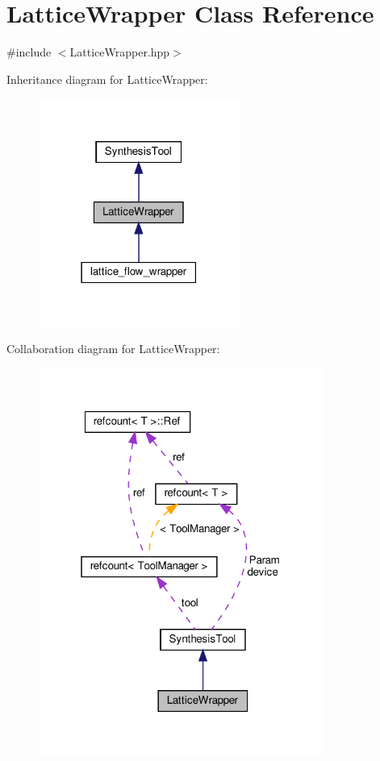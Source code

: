 \hypertarget{classLatticeWrapper}{}\section{Lattice\+Wrapper Class Reference}
\label{classLatticeWrapper}


{\ttfamily \#include $<$Lattice\+Wrapper.\+hpp$>$}



Inheritance diagram for Lattice\+Wrapper\+:
\nopagebreak
\begin{figure}[H]
\begin{center}
\leavevmode
\includegraphics[width=186pt]{d8/d0e/classLatticeWrapper__inherit__graph}
\end{center}
\end{figure}


Collaboration diagram for Lattice\+Wrapper\+:
\nopagebreak
\begin{figure}[H]
\begin{center}
\leavevmode
\includegraphics[width=265pt]{d1/dd4/classLatticeWrapper__coll__graph}
\end{center}
\end{figure}
